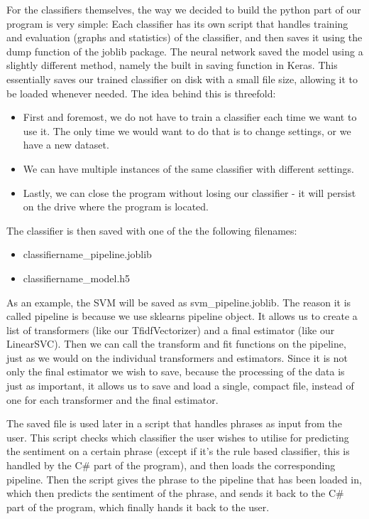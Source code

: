 For the classifiers themselves, the way we decided to build the python part of our program is very simple: Each classifier has its own script that handles training and evaluation (graphs and statistics) of the classifier, and then saves it using the dump function of the joblib package.
The neural network saved the model using a slightly different method, namely the built in saving function in Keras.
This essentially saves our trained classifier on disk with a small file size, allowing it to be loaded whenever needed. The idea behind this is threefold:
\begin{itemize}
	\item First and foremost, we do not have to train a classifier each time we want to use it. The only time we would want to do that is to change settings, or we have a new dataset.
	\item We can have multiple instances of the same classifier with different settings. 
	\item Lastly, we can close the program without losing our classifier - it will persist on the drive where the program is located.
\end{itemize}
The classifier is then saved with one of the the following filenames:
\begin{itemize}
	\item classifiername\_pipeline.joblib
	\item classifiername\_model.h5
\end{itemize}
As an example, the SVM will be saved as svm\_pipeline.joblib.
The reason it is called pipeline is because we use sklearns pipeline object. It allows us to create a list of transformers (like our TfidfVectorizer) and a final estimator (like our LinearSVC). Then we can call the transform and fit functions on the pipeline, just as we would on the individual transformers and estimators. Since it is not only the final estimator we wish to save, because the processing of the data is just as important, it allows us to save and load a single, compact file, instead of one for each transformer and the final estimator.

The saved file is used later in a script that handles phrases as input from the user. This script checks which classifier the user wishes to utilise for predicting the sentiment on a certain phrase (except if it’s the rule based classifier, this is handled by the C\# part of the program), and then loads the corresponding pipeline. Then the script gives the phrase to the pipeline that has been loaded in, which then predicts the sentiment of the phrase, and sends it back to the C\# part of the program, which finally hands it back to the user.


